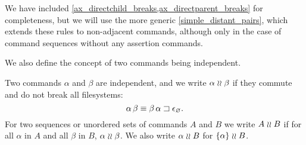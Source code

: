 \begin{mylem}
\begin{list}{\bf Rule~.}{}

\item[] %

\item{}
\axaxseparatecommute

\item{}
\axaxseparatenobreaks

\item{}
\axaxsamebreaks

\item{}
\axaxsameemptyseq

\item{}
\axaxsamesinglec

\item{}
\axaxdirectchildbreaks

\item{}
\axaxdirectparentbreaks

\item{}
\axaxdistantrelbreaks

\item{}
\axaxchildassert

\item{}
\axaxparentassert

\item{}
\axaxassert

\end{list}
\end{mylem}



We have included \cref{ax_directchild_breaks,ax_directparent_breaks}
for completeness, but we will use the more generic \cref{simple_distant_pairs},
which extends these rules to non-adjacent commands, although only in the case
of command sequences without any assertion commands.





\myskip
We also define the concept of two commands being independent.

\begin{mydef}
Two commands $\alpha$ and $\beta$ 
are independent, and we write $\alpha\mathrel{\wr\wr}\beta$ if 
they commute and do not break all filesystems:
\[ \alpha\,\beta \equiv {\beta\,\alpha}\sqsupset\epsilon_\varnothing. \]
For two sequences or unordered sets of commands $A$ and $B$ we write $A\mathrel{\wr\wr} B$ if
for all $\alpha$ in $A$ and all $\beta$ in $B$, $\alpha\mathrel{\wr\wr}\beta$.
We also write $\alpha\mathrel{\wr\wr} B$ for $\{\alpha\}\mathrel{\wr\wr} B$.
\end{mydef}

